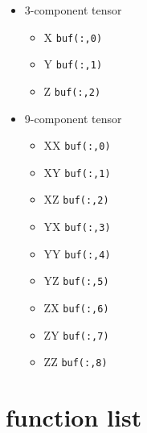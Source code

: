 \documentclass{article}
\begin{document}
\begin{itemize}
\item
  3-component tensor
  \begin{itemize}
  \item
    X \verb!buf(:,0)!
  \item
    Y \verb!buf(:,1)!
  \item
    Z \verb!buf(:,2)!
  \end{itemize}
\item
  9-component tensor
  \begin{itemize}
  \item
    XX \verb!buf(:,0)!
  \item
    XY \verb!buf(:,1)!
  \item
    XZ \verb!buf(:,2)!
  \item
    YX \verb!buf(:,3)!
  \item
    YY \verb!buf(:,4)!
  \item
    YZ \verb!buf(:,5)!
  \item
    ZX \verb!buf(:,6)!
  \item
    ZY \verb!buf(:,7)!
  \item
    ZZ \verb!buf(:,8)!
  \end{itemize}
\end{itemize}
\section{function list}
\end{document}
